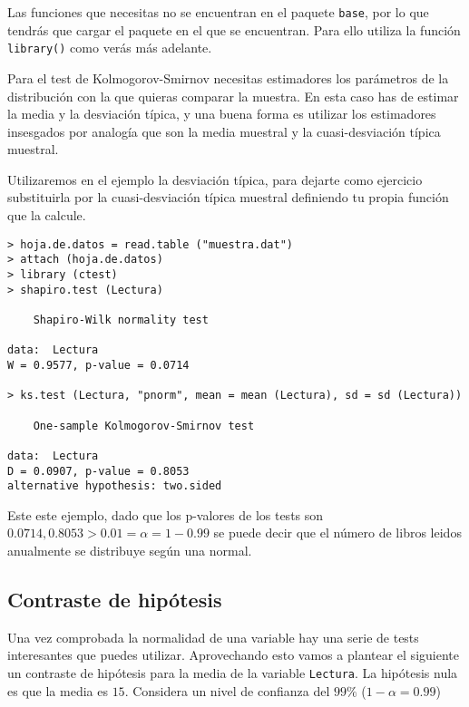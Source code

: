 Las funciones que necesitas no se encuentran en el paquete {\tt base},
por lo que tendrás que cargar el paquete en el que se encuentran. Para
ello utiliza la función {\tt library()} como verás más adelante.

Para  el   test  de   Kolmogorov-Smirnov  necesitas   estimadores  los
parámetros de la distribución con  la que quieras comparar la muestra.
En esta  caso has de  estimar la media y  la desviación típica,  y una
buena forma  es utilizar los  estimadores insesgados por  analogía que
son  la media  muestral  y la  cuasi-desviación  típica muestral.  

Utilizaremos  en  el  ejemplo   la  desviación  típica,  para  dejarte
como ejercicio  substituirla por  la cuasi-desviación  típica muestral
definiendo tu propia función que la calcule.

\begin{verbatim}
> hoja.de.datos = read.table ("muestra.dat")
> attach (hoja.de.datos)
> library (ctest)
> shapiro.test (Lectura)

	Shapiro-Wilk normality test

data:  Lectura 
W = 0.9577, p-value = 0.0714

> ks.test (Lectura, "pnorm", mean = mean (Lectura), sd = sd (Lectura))

	One-sample Kolmogorov-Smirnov test

data:  Lectura 
D = 0.0907, p-value = 0.8053
alternative hypothesis: two.sided 

\end{verbatim}

Este este  ejemplo, dado que los  p-valores de los tests  son $0.0714,
0.8053 >  0.01 = \alpha =  1 - 0.99$ se  puede decir que el  número de
libros leidos anualmente se distribuye según una normal.

\subsection*{Contraste de hipótesis}



Una vez  comprobada la  normalidad de  una variable  hay una  serie de
tests  interesantes que  puedes  utilizar. Aprovechando  esto vamos  a
plantear el  siguiente un contraste de  hipótesis para la media  de la
variable {\tt  Lectura}. La hipótesis  nula es  que la media  es $15$.
Considera un nivel de confianza del $99\%$ ($1 - \alpha = 0.99$)

